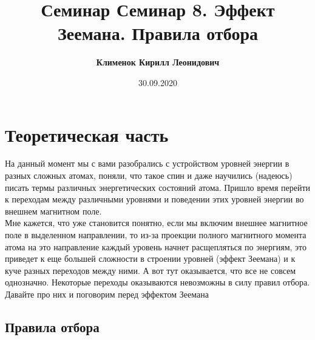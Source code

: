 \documentclass[12pt]{article}
\begin{document}
 
\title{\textbf{Семинар Семинар 8. Эффект Зеемана. Правила отбора}}
\author{\textbf{Клименок Кирилл Леонидович}}
\date{30.09.2020}
\maketitle
\section{Теоретическая часть}
На данный момент мы с вами разобрались с устройством уровней энергии в разных сложных атомах, поняли, что такое спин и даже научились (надеюсь) писать термы различных энергетических состояний атома. Пришло время перейти к переходам между различными уровнями и поведении этих уровней энергии во внешнем магнитном поле.\\
Мне кажется, что уже становится понятно, если мы включим внешнее магнитное поле в выделенном направлении, то из-за проекции полного магнитного момента атома на это направление каждый уровень начнет расщепляться по энергиям, это приведет к еще большей сложности в строении уровней (эффект Зеемана) и к куче разных переходов между ними. А вот тут оказывается, что все не совсем однозначно. Некоторые переходы оказываются невозможны в силу правил отбора. Давайте про них и поговорим перед эффектом Зеемана
\subsection{Правила отбора}
\end{document}
